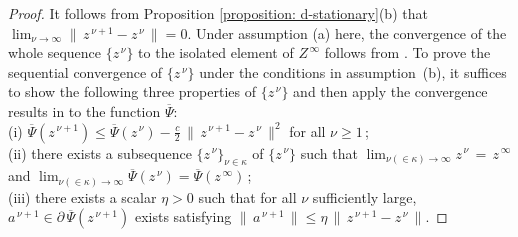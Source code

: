 \documentclass{siamart}
\begin{document}
\begin{proof}
It follows from Proposition \ref{proposition: d-stationary}(b) that $\displaystyle\lim_{\nu\to\infty}\|\,z^{\,\nu+1} - z^{\,\nu}\,\| = 0$.
Under assumption (a) here, the convergence of the whole sequence $\{z^{\,\nu}\}$ to the isolated element of $Z^{\, \infty}$ follows
from \cite[Proposition~8.3.10]{FacchineiPang2003}.  To prove the sequential convergence of $\{z^{\,\nu}\}$ under the conditions in assumption~(b),
it suffices to show the following three properties of $\{z^{\,\nu}\}$ and then apply the convergence results in
\cite[Theorem 2.9]{AttouchBolteSvaiter2013} to the function $\overline\Psi$:
\\[0.05in]
(i) $\overline\Psi(z^{\,\nu+1})\leq \overline\Psi(z^{\,\nu}) - \displaystyle\frac{c}{2}\,\|\,z^{\,\nu+1} - z^{\,\nu}\,\|^2$ for all $\nu\geq 1$\,; \\[0.05in]
(ii) there exists a subsequence $\{z^{\,\nu}\}_{\nu\in \kappa}$ of $\{z^{\,\nu}\}$ such that $\displaystyle\lim_{\nu(\in \kappa)\to \infty}z^{\,\nu}  \, =\,z^{\,\infty}$ and
$\displaystyle\lim_{\nu(\in \kappa)\to \infty}\overline\Psi(z^{\,\nu}) = \overline\Psi(z^{\,\infty})$\,;\\[0.05in]
(iii)  there exists a scalar $\eta>0$ such that for all $\nu$ sufficiently large, $a^{\,\nu+1}\in \partial \, \overline\Psi(z^{\,\nu+1})$ exists satisfying
$\|\,a^{\,\nu+1}\,\| \leq  \eta\,\|\,z^{\,\nu+1} - z^{\,\nu}\,\| $.


\end{proof}
\end{document}
